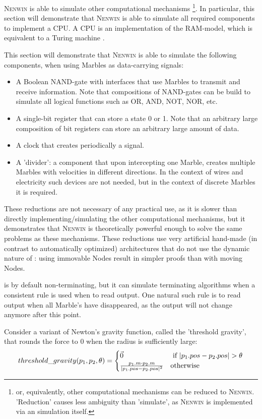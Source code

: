 \textsc{Nenwin} is able to simulate other computational mechanisms \footnote{or, equivalently, other computational mechanisms can be reduced to \textsc{Nenwin}. 'Reduction' causes less ambiguity than 'simulate', as \textsc{Nenwin} is implemented via an simulation itself.}. In particular, this section will demonstrate that \textsc{Nenwin} is able to simulate all required components to implement a CPU. A CPU is an implementation of the RAM-model, which is equivalent to a Turing machine \cite{RAM_cook_reckhow}.

This section will demonstrate that \textsc{Nenwin} is able to simulate the following components, when using Marbles as data-carrying signals:
\begin{itemize}
    \item A Boolean NAND-gate with interfaces that use Marbles to transmit and receive information. Note that compositions of NAND-gates can be build to simulate all logical functions such as OR, AND, NOT, NOR, etc.
    \item A single-bit register that can store a state 0 or 1. Note that an arbitrary large composition of bit registers can store an arbitrary large amount of data.
    \item A clock that creates periodically a signal.
    \item A 'divider': a component that upon intercepting one Marble, creates multiple Marbles with velocities in different directions. In the context of wires and electricity such devices are not needed, but in the context of discrete Marbles it is required.
\end{itemize}

These reductions are not necessary of any practical use, as it is slower than directly implementing/simulating the other computational mechanisms, but it demonstrates that \textsc{Nenwin} is theoretically powerful enough to solve the same problems as these mechanisms.
These reductions use very artificial hand-made (in contrast to automatically optimized) architectures that do not use the dynamic nature of \nenwin: using immovable Nodes result in simpler proofs than with moving Nodes. 

\nenwin is by default non-terminating, but it can simulate terminating algorithms when a consistent rule is used when to read output.
One natural such rule is to read output when all Marble's have disappeared, as the output will not change anymore after this point.

Consider a variant of Newton's gravity function, called the 'threshold gravity', that rounds the force to 0 when the radius is sufficiently large:
\begin{equation}
    threshold\_gravity(p_1, p_2, \theta) = \begin{cases}
        \vec{0} & \text{ if } \lvert p_1.pos - p_2.pos \rvert > \theta \\
        \frac{p_1.m \cdot p_2.m}{\lvert p_1.pos - p_2.pos \rvert^2} & \text{otherwise}
        \end{cases} \label{eq:tresholdgrav}
\end{equation}

